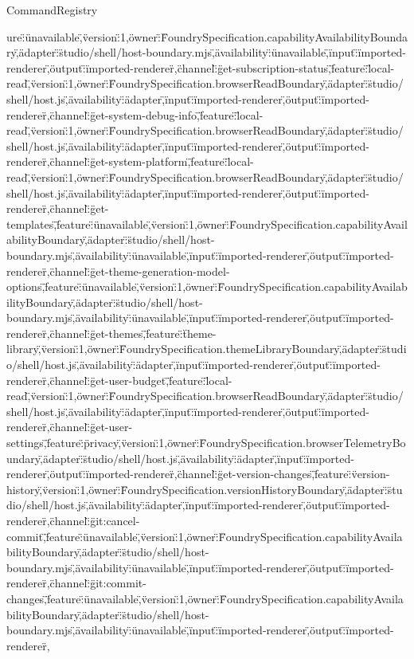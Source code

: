 \begin{lexlean}{CommandRegistry}
\begin{semanticmodule}
{ure\":\"unavailable\",\"version\":1,\"owner\":\"FoundrySpecification.capabilityAvailabilityBoundary\",\"adapter\":\"studio/shell/host-boundary.mjs\",\"availability\":\"unavailable\",\"input\":\"imported-renderer\",\"output\":\"imported-renderer\"},{\"channel\":\"get-subscription-status\",\"feature\":\"local-read\",\"version\":1,\"owner\":\"FoundrySpecification.browserReadBoundary\",\"adapter\":\"studio/shell/host.js\",\"availability\":\"adapter\",\"input\":\"imported-renderer\",\"output\":\"imported-renderer\"},{\"channel\":\"get-system-debug-info\",\"feature\":\"local-read\",\"version\":1,\"owner\":\"FoundrySpecification.browserReadBoundary\",\"adapter\":\"studio/shell/host.js\",\"availability\":\"adapter\",\"input\":\"imported-renderer\",\"output\":\"imported-renderer\"},{\"channel\":\"get-system-platform\",\"feature\":\"local-read\",\"version\":1,\"owner\":\"FoundrySpecification.browserReadBoundary\",\"adapter\":\"studio/shell/host.js\",\"availability\":\"adapter\",\"input\":\"imported-renderer\",\"output\":\"imported-renderer\"},{\"channel\":\"get-templates\",\"feature\":\"unavailable\",\"version\":1,\"owner\":\"FoundrySpecification.capabilityAvailabilityBoundary\",\"adapter\":\"studio/shell/host-boundary.mjs\",\"availability\":\"unavailable\",\"input\":\"imported-renderer\",\"output\":\"imported-renderer\"},{\"channel\":\"get-theme-generation-model-options\",\"feature\":\"unavailable\",\"version\":1,\"owner\":\"FoundrySpecification.capabilityAvailabilityBoundary\",\"adapter\":\"studio/shell/host-boundary.mjs\",\"availability\":\"unavailable\",\"input\":\"imported-renderer\",\"output\":\"imported-renderer\"},{\"channel\":\"get-themes\",\"feature\":\"theme-library\",\"version\":1,\"owner\":\"FoundrySpecification.themeLibraryBoundary\",\"adapter\":\"studio/shell/host.js\",\"availability\":\"adapter\",\"input\":\"imported-renderer\",\"output\":\"imported-renderer\"},{\"channel\":\"get-user-budget\",\"feature\":\"local-read\",\"version\":1,\"owner\":\"FoundrySpecification.browserReadBoundary\",\"adapter\":\"studio/shell/host.js\",\"availability\":\"adapter\",\"input\":\"imported-renderer\",\"output\":\"imported-renderer\"},{\"channel\":\"get-user-settings\",\"feature\":\"privacy\",\"version\":1,\"owner\":\"FoundrySpecification.browserTelemetryBoundary\",\"adapter\":\"studio/shell/host.js\",\"availability\":\"adapter\",\"input\":\"imported-renderer\",\"output\":\"imported-renderer\"},{\"channel\":\"get-version-changes\",\"feature\":\"version-history\",\"version\":1,\"owner\":\"FoundrySpecification.versionHistoryBoundary\",\"adapter\":\"studio/shell/host.js\",\"availability\":\"adapter\",\"input\":\"imported-renderer\",\"output\":\"imported-renderer\"},{\"channel\":\"git:cancel-commit\",\"feature\":\"unavailable\",\"version\":1,\"owner\":\"FoundrySpecification.capabilityAvailabilityBoundary\",\"adapter\":\"studio/shell/host-boundary.mjs\",\"availability\":\"unavailable\",\"input\":\"imported-renderer\",\"output\":\"imported-renderer\"},{\"channel\":\"git:commit-changes\",\"feature\":\"unavailable\",\"version\":1,\"owner\":\"FoundrySpecification.capabilityAvailabilityBoundary\",\"adapter\":\"studio/shell/host-boundary.mjs\",\"availability\":\"unavailable\",\"input\":\"imported-renderer\",\"output\":\"imported-renderer\"},{}
\end{semanticmodule}
\end{lexlean}
